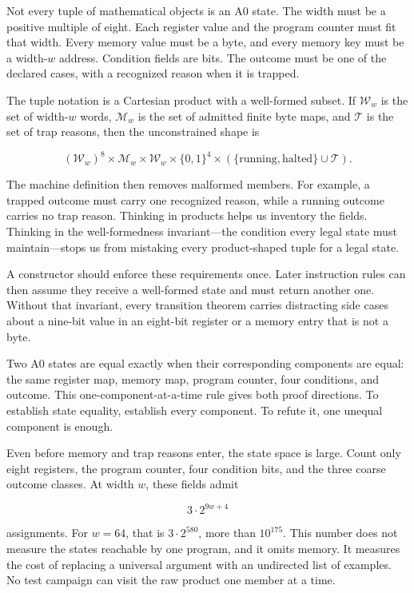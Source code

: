 Not every tuple of mathematical objects is an A0 state. The width must be a
positive multiple of eight. Each register value and the program counter must
fit that width. Every memory value must be a byte, and every memory key must be
a width-\(w\) address. Condition fields are bits. The outcome must be one of the
declared cases, with a recognized reason when it is trapped.

The tuple notation is a Cartesian product with a well-formed subset. If
\(\mathcal W_w\) is the set of width-\(w\) words, \(\mathcal M_w\) is the
set of admitted finite byte maps, and \(\mathcal T\) is the set of trap
reasons, then the unconstrained shape is

\[
(\mathcal W_w)^8\mathbin{\times}\mathcal M_w
\mathbin{\times}\mathcal W_w\mathbin{\times}\{0,1\}^4
\mathbin{\times}(\{\mathrm{running},\mathrm{halted}\}\cup\mathcal T).
\]

The machine definition then removes malformed members. For example, a trapped
outcome must carry one recognized reason, while a running outcome carries no
trap reason. Thinking in products helps us inventory the fields. Thinking in
the well-formedness invariant---the condition every legal state must
maintain---stops us from mistaking every product-shaped tuple for a legal
state.

A constructor should enforce these requirements once. Later instruction
rules can then assume they receive a well-formed state and must return another
one. Without that invariant, every transition theorem carries distracting
side cases about a nine-bit value in an eight-bit register or a memory entry
that is not a byte.

Two A0 states are equal exactly when their corresponding components are equal:
the same register map, memory map, program counter, four conditions, and
outcome. This one-component-at-a-time rule gives both proof directions. To establish
state equality, establish every component. To refute it, one unequal component
is enough.

Even before memory and trap reasons enter, the state space is large. Count
only eight registers, the program counter, four condition bits, and the three
coarse outcome classes. At width \(w\), these fields admit

\[
3\cdot 2^{9w+4}
\]

assignments. For \(w=64\), that is \(3\cdot2^{580}\), more than
\(10^{175}\). This number does not measure the states reachable by one
program, and it omits memory. It measures the cost of replacing a universal
argument with an undirected list of examples. No test campaign can visit the
raw product one member at a time.

